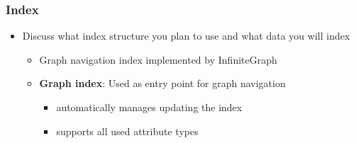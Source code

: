 
\begin{frame}
\frametitle{Index}

\begin{itemize}
	\item Discuss what index structure you plan to use and what data you will index
	\begin{itemize}
		\item Graph navigation index implemented by InfiniteGraph 
		\item \textbf{Graph index}: Used as entry point for graph navigation
		\begin{itemize}
			\item automatically manages updating the index
			\item supports all used attribute types
		\end{itemize}	
	\end{itemize}
		
\end{itemize}

\end{frame}